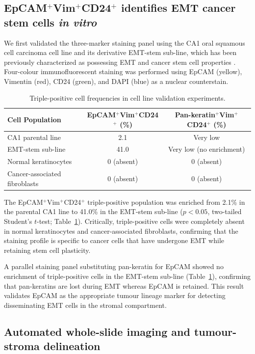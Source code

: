 \documentclass[11pt]{article}
\begin{document}
\subsection{EpCAM$^{+}$Vim$^{+}$CD24$^{+}$ identifies EMT cancer stem cells \textit{in vitro}}

We first validated the three-marker staining panel using the CA1 oral squamous cell carcinoma cell line and its derivative EMT-stem sub-line, which has been previously characterized as possessing EMT and cancer stem cell properties \citep{Grosse-Wilde2015}. Four-colour immunofluorescent staining was performed using EpCAM (yellow), Vimentin (red), CD24 (green), and DAPI (blue) as a nuclear counterstain.

\begin{table}[ht]
\centering
\caption{Triple-positive cell frequencies in cell line validation experiments.}
\label{tab:celllines}
\begin{tabular}{lcc}
\toprule
Cell Population & EpCAM$^{+}$Vim$^{+}$CD24$^{+}$ (\%) & Pan-keratin$^{+}$Vim$^{+}$CD24$^{+}$ (\%) \\
\midrule
CA1 parental line & 2.1 & Very low \\
EMT-stem sub-line & 41.0 & Very low (no enrichment) \\
Normal keratinocytes & 0 (absent) & 0 (absent) \\
Cancer-associated fibroblasts & 0 (absent) & 0 (absent) \\
\bottomrule
\end{tabular}
\end{table}

The EpCAM$^{+}$Vim$^{+}$CD24$^{+}$ triple-positive population was enriched from 2.1\% in the parental CA1 line to 41.0\% in the EMT-stem sub-line ($p < 0.05$, two-tailed Student's $t$-test; Table~\ref{tab:celllines}). Critically, triple-positive cells were completely absent in normal keratinocytes and cancer-associated fibroblasts, confirming that the staining profile is specific to cancer cells that have undergone EMT while retaining stem cell plasticity.

A parallel staining panel substituting pan-keratin for EpCAM showed no enrichment of triple-positive cells in the EMT-stem sub-line (Table~\ref{tab:celllines}), confirming that pan-keratins are lost during EMT whereas EpCAM is retained. This result validates EpCAM as the appropriate tumour lineage marker for detecting disseminating EMT cells in the stromal compartment.

\subsection{Automated whole-slide imaging and tumour-stroma delineation}
\end{document}
